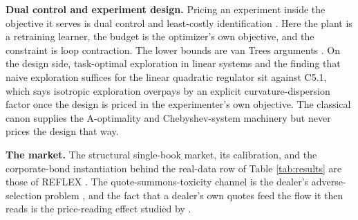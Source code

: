 \textbf{Dual control and experiment design.} Pricing an experiment inside the
objective it serves is dual control \citep{feldbaum1960dual} and least-costly
identification \citep{bombois2006least}. Here the plant is a retraining
learner, the budget is the optimizer's own objective, and the constraint is
loop contraction. The lower bounds are van Trees arguments
\citep{gill1995applications}. On the design side, task-optimal exploration in
linear systems \citep{wagenmaker2021task,dean2020sample} and the finding that
naive exploration suffices for the linear quadratic regulator
\citep{simchowitz2020naive} sit against C5.1, which says isotropic exploration
overpays by an explicit curvature-dispersion factor once the design is priced
in the experimenter's own objective. The classical canon
\citep{kiefer1960equivalence,pukelsheim2006optimal} supplies the A-optimality
and Chebyshev-system machinery but never prices the design that way.

\textbf{The market.} The structural single-book market, its calibration, and
the corporate-bond instantiation behind the real-data row of Table
\ref{tab:results} are those of REFLEX \citep{reflex2026}. The
quote-summons-toxicity channel is the dealer's adverse-selection problem
\citep{gueant2013inventory}, and the fact that a dealer's own quotes feed the
flow it then reads is the price-reading effect studied by
\citet{barzykin2026quoting}.
